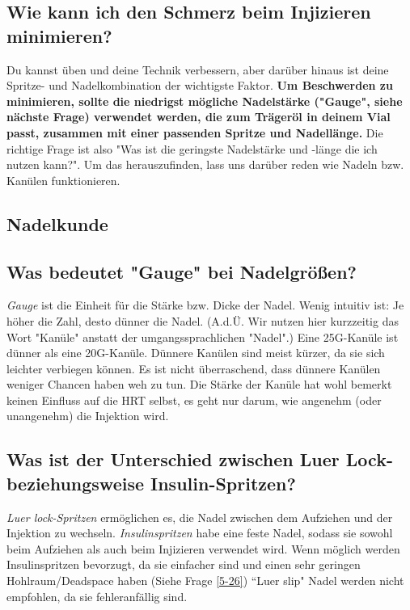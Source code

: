 \documentclass{article}
\begin{document}
\subsection{Wie kann ich den Schmerz beim Injizieren minimieren?}

Du kannst üben und deine Technik verbessern, aber darüber hinaus ist deine Spritze- und Nadelkombination der wichtigste Faktor. \textbf{Um Beschwerden zu minimieren, sollte die niedrigst mögliche Nadelstärke ("Gauge", siehe nächste Frage) verwendet werden, die zum Trägeröl in deinem Vial passt, zusammen mit einer passenden Spritze und Nadellänge. }Die richtige Frage ist also "Was ist die geringste Nadelstärke und -länge die ich nutzen kann?". Um das herauszufinden, lass uns darüber reden wie Nadeln bzw. Kanülen funktionieren.

\subsection*{Nadelkunde}

\subsection{Was bedeutet "Gauge" bei Nadelgrößen?}

\textit{Gauge }ist die Einheit für die Stärke bzw. Dicke der Nadel. Wenig intuitiv ist: Je höher die Zahl, desto dünner die Nadel. (A.d.Ü. Wir nutzen hier kurzzeitig das Wort "Kanüle" anstatt der umgangssprachlichen "Nadel".) Eine 25G-Kanüle ist dünner als eine 20G-Kanüle. Dünnere Kanülen sind meist kürzer, da sie sich leichter verbiegen können. Es ist nicht überraschend, dass dünnere Kanülen weniger Chancen haben weh zu tun. Die Stärke der Kanüle hat wohl bemerkt keinen Einfluss auf die HRT selbst, es geht nur darum, wie angenehm (oder unangenehm) die Injektion wird.

\subsection{Was ist der Unterschied zwischen Luer Lock- beziehungsweise Insulin-Spritzen?}\label{5-13}

\textit{Luer lock-Spritzen} ermöglichen es, die Nadel zwischen dem Aufziehen und der Injektion zu wechseln. \textit{Insulinspritzen} habe eine feste Nadel, sodass sie sowohl beim Aufziehen als auch beim Injizieren verwendet wird. Wenn möglich werden Insulinspritzen bevorzugt, da sie einfacher sind und einen sehr geringen Hohlraum/Deadspace haben (Siehe Frage \ref{5-26}) “Luer slip" Nadel werden nicht empfohlen, da sie fehleranfällig sind.
\end{document}
